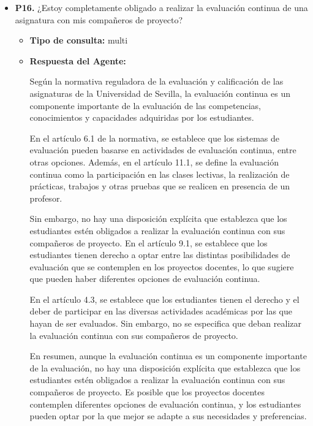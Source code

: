 \documentclass{article}
\begin{document}
\begin{itemize}
\begin{itemize}
            \end{itemize}

      \item \textbf{P16.} ¿Estoy completamente obligado a realizar la evaluación continua de una asignatura con mis compañeros de proyecto? \\
            \begin{itemize}
                  \item \textbf{Tipo de consulta:} multi
                  \item \textbf{Respuesta del Agente:}

                        Según la normativa reguladora de la evaluación y calificación de las asignaturas de la Universidad de Sevilla, la evaluación continua es un componente importante de la evaluación de las competencias, conocimientos y capacidades adquiridas por los estudiantes.

                        En el artículo 6.1 de la normativa, se establece que los sistemas de evaluación pueden basarse en actividades de evaluación continua, entre otras opciones. Además, en el artículo 11.1, se define la evaluación continua como la participación en las clases lectivas, la realización de prácticas, trabajos y otras pruebas que se realicen en presencia de un profesor.

                        Sin embargo, no hay una disposición explícita que establezca que los estudiantes estén obligados a realizar la evaluación continua con sus compañeros de proyecto. En el artículo 9.1, se establece que los estudiantes tienen derecho a optar entre las distintas posibilidades de evaluación que se contemplen en los proyectos docentes, lo que sugiere que pueden haber diferentes opciones de evaluación continua.

                        En el artículo 4.3, se establece que los estudiantes tienen el derecho y el deber de participar en las diversas actividades académicas por las que hayan de ser evaluados. Sin embargo, no se especifica que deban realizar la evaluación continua con sus compañeros de proyecto.

                        En resumen, aunque la evaluación continua es un componente importante de la evaluación, no hay una disposición explícita que establezca que los estudiantes estén obligados a realizar la evaluación continua con sus compañeros de proyecto. Es posible que los proyectos docentes contemplen diferentes opciones de evaluación continua, y los estudiantes pueden optar por la que mejor se adapte a sus necesidades y preferencias.


\end{itemize}
\end{itemize}
\end{document}
